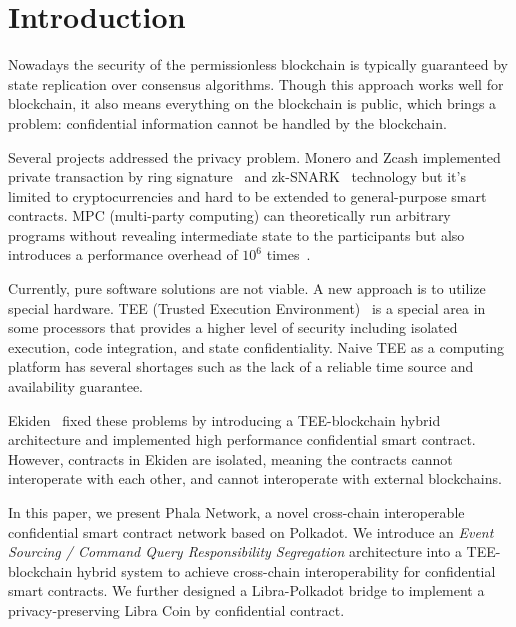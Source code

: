 \section{Introduction}

Nowadays the security of the permissionless blockchain is typically guaranteed by state replication over consensus algorithms. Though this approach works well for blockchain, it also means everything on the blockchain is public, which brings a problem: confidential information cannot be handled by the blockchain.

Several projects addressed the privacy problem. Monero and Zcash implemented private transaction by ring signature~\cite{xxx} and zk-SNARK~\cite{xxx} technology but it's limited to cryptocurrencies and hard to be extended to general-purpose smart contracts. MPC (multi-party computing) can theoretically run arbitrary programs without revealing intermediate state to the participants but also introduces a performance overhead of $10^6$ times~\cite{cheng2019ekiden}.

Currently, pure software solutions are not viable. A new approach is to utilize special hardware. TEE (Trusted Execution Environment)~\cite{teewiki} is a special area in some processors that provides a higher level of security including isolated execution, code integration, and state confidentiality. Naive TEE as a computing platform has several shortages such as the lack of a reliable time source and availability guarantee.

Ekiden~\cite{cheng2019ekiden} fixed these problems by introducing a TEE-blockchain hybrid architecture and implemented high performance confidential smart contract. However, contracts in Ekiden are isolated, meaning the contracts cannot interoperate with each other, and cannot interoperate with external blockchains.

In this paper, we present Phala Network, a novel cross-chain interoperable confidential smart contract network based on Polkadot. We introduce an \textit{Event Sourcing / Command Query Responsibility Segregation} architecture into a TEE-blockchain hybrid system to achieve cross-chain interoperability for confidential smart contracts. We further designed a Libra-Polkadot bridge to implement a privacy-preserving Libra Coin by confidential contract.
